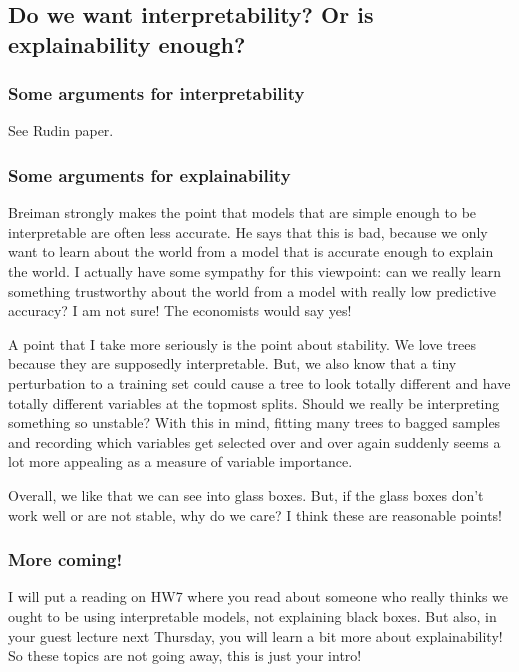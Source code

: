 \subsection{Do we want interpretability? Or is explainability enough?}

\subsubsection{Some arguments for interpretability}

See Rudin paper. 

\subsubsection{Some arguments for explainability}

Breiman strongly makes the point that models that are simple enough to be interpretable are often less accurate. He says that this is bad, because we only want to learn about the world from a model that is accurate enough to explain the world. I actually have some sympathy for this viewpoint: can we really learn something trustworthy about the world from a model with really low predictive accuracy? I am not sure! The economists would say yes!

A point that I take more seriously is the point about stability. We love trees because they are supposedly interpretable. But, we also know that a tiny perturbation to a training set could cause a tree to look totally different and have totally different variables at the topmost splits. Should we really be interpreting something so unstable? With this in mind, fitting many trees to bagged samples and recording which variables get selected over and over again suddenly seems a lot more appealing as a measure of variable importance.

Overall, we like that we can see into glass boxes. But, if the glass boxes don't work well or are not stable, why do we care? I think these are reasonable points!

\subsubsection{More coming!}

I will put a reading on HW7 where you read about someone who really thinks we ought to be using interpretable models, not explaining black boxes. But also, in your guest lecture next Thursday, you will learn a bit more about explainability! So these topics are not going away, this is just your intro!



